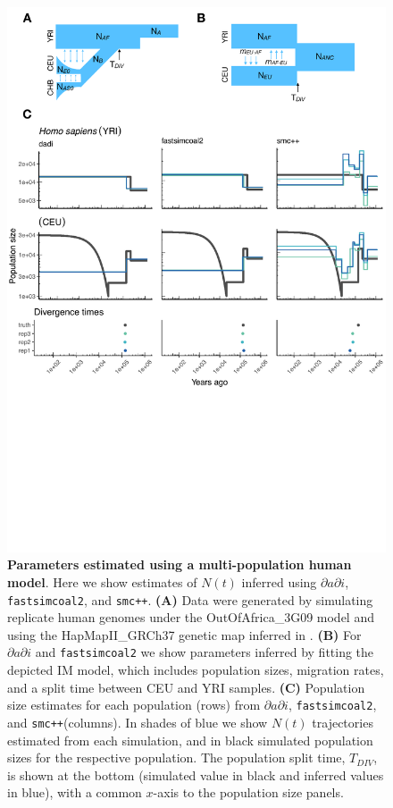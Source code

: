 \documentclass[12pt,halfline,a4paper]{ouparticle}
\newcommand{\dadi}{$\partial a \partial i$\xspace}
\newcommand{\smcpp}{\texttt{smc++}\xspace}
\newcommand{\fastsimcoal}{\texttt{fastsimcoal2}\xspace}
\begin{document}
\begin{figure}
\begin{center}
\includegraphics[width=0.7\linewidth]{display_items/homo_sapiens_two_pop_comp.pdf}
\caption{\textbf{Parameters estimated using a multi-population human model}.
Here we show estimates of $N(t)$ inferred using \dadi, \fastsimcoal, and \smcpp. \textbf{(A)} Data were generated by simulating
replicate human genomes under the OutOfAfrica\_3G09 model and using the HapMapII\_GRCh37 genetic map
inferred in \cite{international2007second}. \textbf{(B)} For \dadi and \fastsimcoal we show parameters inferred
by fitting the depicted IM model, which includes population sizes, migration rates, and a split
time between CEU and YRI samples. \textbf{(C)} Population size estimates for each population (rows)
from \dadi, \fastsimcoal, and \smcpp (columns).
In shades of blue we show $N(t)$ trajectories estimated from each simulation,
and in black simulated population sizes for the respective population.
The population split time, $T_{DIV}$, is shown at
the bottom (simulated value in black and inferred values in blue),
with a common $x$-axis to the population size panels.}
\label{fig:IM_popn_human}
\end{center}
\end{figure}
\end{document}
